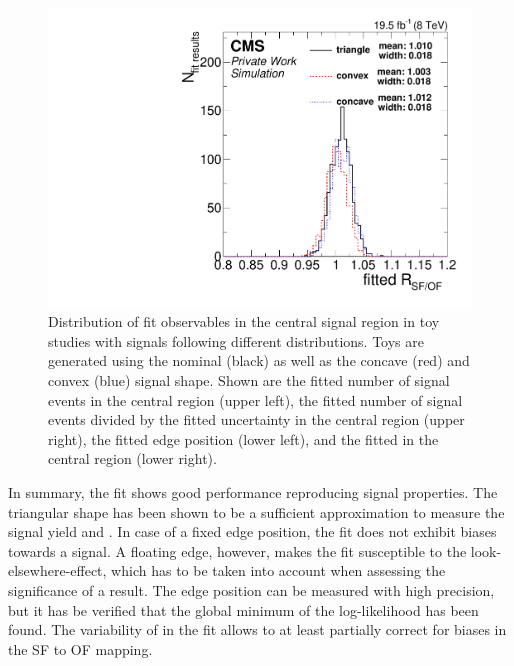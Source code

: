 \begin{figure}[b]
\begin{minipage}[t]{0.49\textwidth}
  \end{minipage}
  \begin{minipage}[t]{0.49\textwidth}
    \includegraphics[width=\textwidth]{plots/results/fit/toyResults/rSFOF_shapeBias.pdf}
  \end{minipage}
  \caption{Distribution of fit observables in the central signal region in toy studies with signals following different distributions. Toys are generated using the nominal (black) as well as the concave (red) and convex (blue) signal shape. Shown are the fitted number of signal events in the central region (upper left), the fitted number of signal events divided by the fitted uncertainty in the central region (upper right), the fitted edge position (lower left), and the fitted \Rsfof in the central region (lower right).}
  \label{fig:toys:signalInjectedShapeBias}
\end{figure}

In summary, the fit shows good performance reproducing signal properties. The triangular shape has been shown to be a sufficient approximation to measure the signal yield and \mlledge. In case of a fixed edge position, the fit does not exhibit biases towards a signal. A floating edge, however, makes the fit susceptible to the look-elsewhere-effect, which has to be taken into account when assessing the significance of a result. The edge position can be measured with high precision, but it has be verified that the global minimum of the log-likelihood has been found. The variability of \Rsfof in the fit allows to at least partially correct for biases in the SF to OF mapping.
\clearpage
